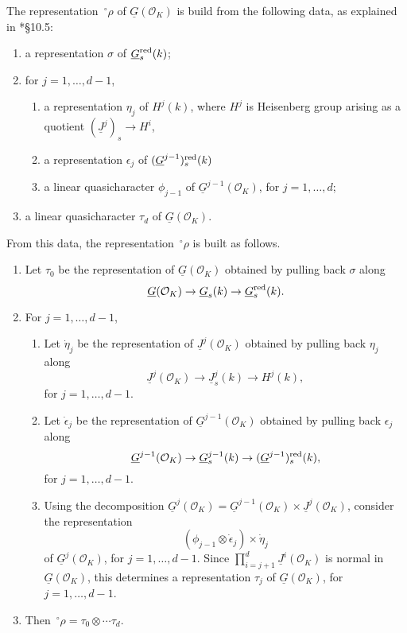 \documentclass[10pt]{amsart}
\theoremstyle{plain}
\theoremstyle{definition}
\newcommand{\OK}{\mathcal{O}_K}
\newcommand{\Fq}{k}
\begin{document}
The representation $\,^\circ \rho$ of $\underline{G}(\OK)$ is build from the following data, as explained in \cite{yu:models}*{\S 10.5}:
\begin{enumerate}
\item
	a representation $\sigma$ of $\underline{G}_s\red(\Fq)$;
\item
for $j=1,\ldots, d-1$, 
\begin{enumerate}
\item
a representation $\eta_j$ of $H^j(\Fq)$, where $H^j$ is Heisenberg group arising as a quotient $(\underline{J}^{j})_s \to H^i$,
\item
a representation $\epsilon_j$ of $(\underline{G}^{j-1})_s\red(\Fq)$
\item
a linear quasicharacter $\phi_{j-1}$ of $\underline{G}^{j-1}(\OK)$, for $j=1,\ldots, d$;
\end{enumerate}
\item
	a linear quasicharacter $\tau_d$ of $\underline{G}(\OK)$.
\end{enumerate}
From this data, the representation $\,^\circ \rho$ is built as follows.
\begin{enumerate}
\item 
	Let $\tau_0$ be the representation of $\underline{G}(\OK)$ obtained by pulling back $\sigma$ along 
\[\underline{G}(\OK) \to \underline{G}_s(\Fq) \to \underline{G}_s\red(\Fq).\]
\item For $j=1,\ldots, d-1$, 
\begin{enumerate}
\item
	Let $\dot{\eta}_j$ be the representation of $\underline{J}^j(\OK)$ obtained by pulling back $\eta_j$ along 
\[\underline{J}^{j}(\OK) \to \underline{J}^{j}_s(\Fq) \to H^j(\Fq),\]
for $j=1,\ldots, d-1$.
\item 
	Let $\dot{\epsilon}_j$ be the representation of $\underline{G}^{j-1}(\OK)$ obtained by pulling back $\epsilon_j$ along 
\[\underline{G}^{j-1}(\OK) \to \underline{G}^{j-1}_s(\Fq) \to (\underline{G}^{j-1})_s\red(\Fq),\]
for $j=1,\ldots, d-1$.
\item
	Using the decomposition $\underline{G}^j(\OK) = \underline{G}^{j-1}(\OK) \times \underline{J}^j(\OK)$, consider the representation 
\[
	(\phi_{j-1}\otimes \dot{\epsilon}_j)\times \dot{\eta}_j
\]
 of $\underline{G}^{j}(\OK)$, for $j=1,\ldots, d-1$. 
	Since $\prod_{i=j+1}^{d} \underline{J}^i(\OK)$ is normal in $\underline{G}(\OK)$, this determines a representation $\tau_j$ of $\underline{G}(\OK)$, for $j=1,\ldots, d-1$. 
\end{enumerate}
\item
	Then $\,^\circ \rho = \tau_0 \otimes \cdots \tau_d$.
\end{enumerate}
\end{document}
